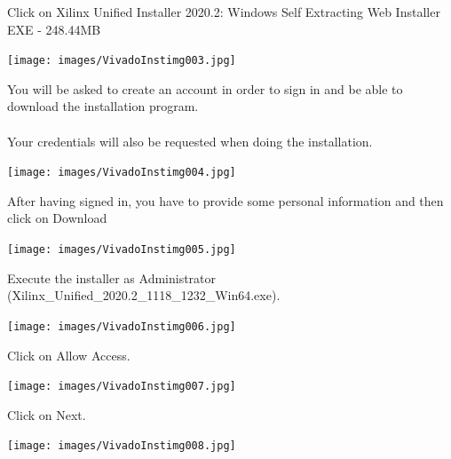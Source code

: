 \begin{minipage}{\linewidth}
  Click on Xilinx Unified Installer 2020.2: Windows Self Extracting Web Installer EXE - 248.44MB
  \\
  \begin{center}
    \texttt{[image: images/VivadoInstimg003.jpg]}
  \end{center}
\end{minipage}

\begin{minipage}{\linewidth}
  You will be asked to create an account in order to sign in and be able to download the installation program. \\
  \\
  Your credentials will also be requested when doing the installation.
  \\
  \begin{center}
    \texttt{[image: images/VivadoInstimg004.jpg]}
  \end{center}
\end{minipage}

\begin{minipage}{\linewidth}
  After having signed in, you have to provide some personal information and then click on Download
  \\
  \begin{center}
    \texttt{[image: images/VivadoInstimg005.jpg]}
  \end{center}
\end{minipage}

\begin{minipage}{\linewidth}
  Execute the installer as Administrator (Xilinx\_Unified\_2020.2\_1118\_1232\_Win64.exe).
  \\
  \begin{center}
    \texttt{[image: images/VivadoInstimg006.jpg]}
  \end{center}
\end{minipage}

\begin{minipage}{\linewidth}
  Click on Allow Access.
  \\
  \begin{center}
    \texttt{[image: images/VivadoInstimg007.jpg]}
  \end{center}
\end{minipage}

\begin{minipage}{\linewidth}
  Click on Next.
  \\
  \begin{center}
    \texttt{[image: images/VivadoInstimg008.jpg]}
  \end{center}
\end{minipage}

